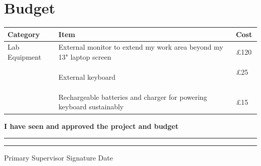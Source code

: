 \documentclass[11pt, a4paper]{article}
\begin{document}
\section{Budget}

\begin{center}
\begin{tabularx}{7in}{ L{0.6} | L{1.2} | L{0.2} }
	\textbf{Category} & \textbf{Item} & \textbf{Cost} \\\hline
	 
	 Lab Equipment & External monitor to extend my work area beyond my 13" laptop screen & \pounds 120 \\\\
	 
	 & External keyboard & \pounds 25 \
	 \\\\
	 
	 & Rechargeable batteries and charger for powering keyboard sustainably & \pounds 15

\end{tabularx}
\end{center}

\pagebreak

\vspace*{\fill}
\textbf{I have seen and approved the project and budget}

\vspace{0.8cm}
\rule{5in}{0.5pt}
\null\hfill\rule{1in}{0.5pt}

Primary Supervisor Signature
\null\hfill Date

\vspace*{\fill}
\pagebreak


\end{document}
